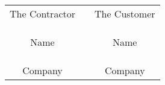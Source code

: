 \documentclass{article}
\begin{document}
\begin{table}[h]
\begin{tabular}{ccc}
The Contractor & \hspace{3cm} & The Customer \\
& & \\
& & \\
\hrulefill & \hspace{3cm} & \hrulefill \\
%
Name & \hspace{3cm} & Name \\
& & \\
& & \\
\hrulefill & \hspace{3cm} & \hrulefill \\
Company & \hspace{3cm} & Company \\
\end{tabular}
\end{table}
\end{document}
